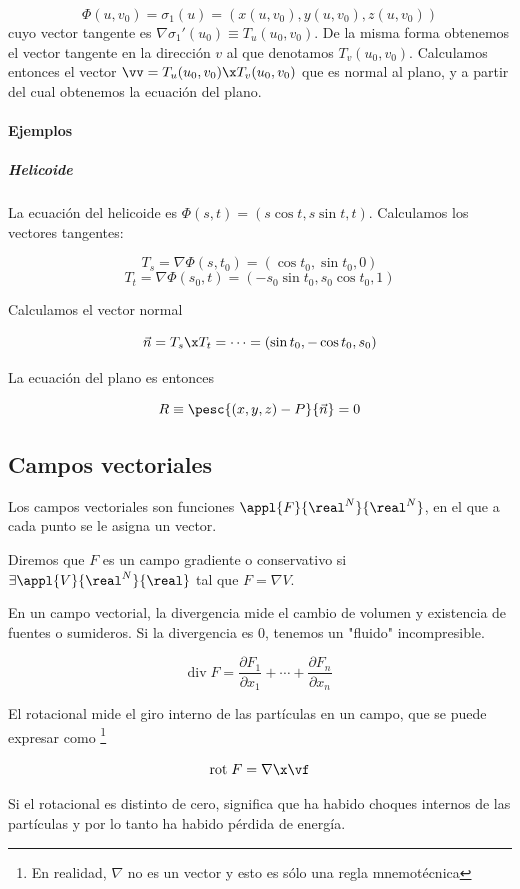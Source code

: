 \documentclass[nochap]{apuntes}
\begin{document}
\[ \Phi(u, v_0) = \sigma_1(u) = (x(u, v_0),y(u, v_0),z(u, v_0)) \]
cuyo vector tangente es $\nabla \sigma_1'(u_0) \equiv T_u (u_0, v_0)$. De la misma forma obtenemos el vector tangente en la dirección $v$ al que denotamos $T_v(u_0, v_0)$. Calculamos entonces el vector $\vv = T_u(u_0, v_0)\x T_v(u_0, v_0)$ que es normal al plano, y a partir del cual obtenemos la ecuación del plano.


\paragraph{Ejemplos}
\subparagraph{Helicoide} La ecuación  del helicoide es $\Phi(s,t) = (s\cos t, s\sin t, t)$. Calculamos los vectores tangentes:

\[ T_s = \nabla \Phi(s, t_0) = (\cos t_0, \sin t_0, 0) \]
\[ T_t = \nabla \Phi(s_0, t) = (-s_0\sin t_0, s_0 \cos t_0, 1) \]

Calculamos el vector normal

\[ \vec{n} = T_s \x T_t = \cdots = (\sin t_0, -\cos t_0, s_0) \]

La ecuación del plano es entonces

\[ R\equiv \pesc{(x,y,z) - P}{\vec{n}} = 0 \]

\subsection{Campos vectoriales}
Los campos vectoriales son funciones $\appl{F}{\real^N}{\real^N}$, en el que a cada punto se le asigna un vector.

\begin{defn}
Diremos que $F$ es un campo gradiente o conservativo si $\exists \appl{V}{\real^N}{\real}$ tal que $F=\nabla V$.
\end{defn}

\begin{defn}[Divergencia]
En un campo vectorial, la divergencia mide el cambio de volumen y existencia de fuentes o sumideros. Si la divergencia es 0, tenemos un "fluido" incompresible.

\[ \textrm{div}\;F = \frac{∂F_1}{∂x_1} + \cdots + \frac{∂F_n}{∂x_n} \]
\end{defn}

\begin{defn}[Rotacional]
El rotacional mide el giro interno de las partículas en un campo, que se puede expresar como \footnote{En realidad, $\nabla$ no es un vector y esto es sólo una regla mnemotécnica}

\[ \textrm{rot}\;F = \nabla \x \vf \]

Si el rotacional es distinto de cero, significa que ha habido choques internos de las partículas y por lo tanto ha habido pérdida de energía.
\end{defn}
\end{document}
